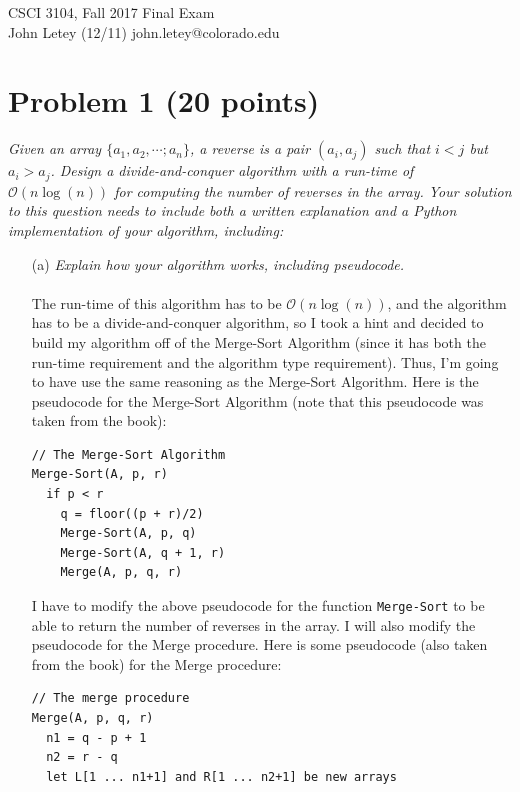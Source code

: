 \documentclass[12pt]{article}
\begin{document}
CSCI 3104, Fall 2017 \hfill Final Exam\\
John Letey (12/11) \hfill john.letey@colorado.edu\vspace{-11mm}

\hrulefill

{\selectfont\vspace{-8mm}
\section*{{\selectfont Problem 1 (20 points)}}\vspace{-10mm}
\textsl{Given an array $\{a_1, a_2, \cdots; a_n\}$, a reverse is a pair $(a_i, a_j)$ such that $i < j$ but $a_i > a_j$. Design a divide-and-conquer algorithm with a run-time of $\mathcal{O}(n\log(n))$ for computing the number of reverses in the array. Your solution to this question needs to include both a written explanation and a Python implementation of your algorithm, including:}
\begin{enumerate}
\item[(a)]\textsl{Explain how your algorithm works, including pseudocode.}\\ \\
The run-time of this algorithm has to be $\mathcal{O}(n\log(n))$, and the algorithm has to be a divide-and-conquer algorithm, so I took a hint and decided to build my algorithm off of the Merge-Sort Algorithm (since it has both the run-time requirement and the algorithm type requirement). Thus, I'm going to have use the same reasoning as the Merge-Sort Algorithm. Here is the pseudocode for the Merge-Sort Algorithm (note that this pseudocode was taken from the book):
\begin{lstlisting}
// The Merge-Sort Algorithm
Merge-Sort(A, p, r)
  if p < r
    q = floor((p + r)/2)
    Merge-Sort(A, p, q)
    Merge-Sort(A, q + 1, r)
    Merge(A, p, q, r)
\end{lstlisting}
I have to modify the above pseudocode for the function \texttt{Merge-Sort} to be able to return the number of reverses in the array. I will also modify the pseudocode for the Merge procedure. Here is some pseudocode (also taken from the book) for the Merge procedure:
\begin{lstlisting}
// The merge procedure
Merge(A, p, q, r)
  n1 = q - p + 1
  n2 = r - q
  let L[1 ... n1+1] and R[1 ... n2+1] be new arrays

\end{lstlisting}
\end{enumerate}}
\end{document}
